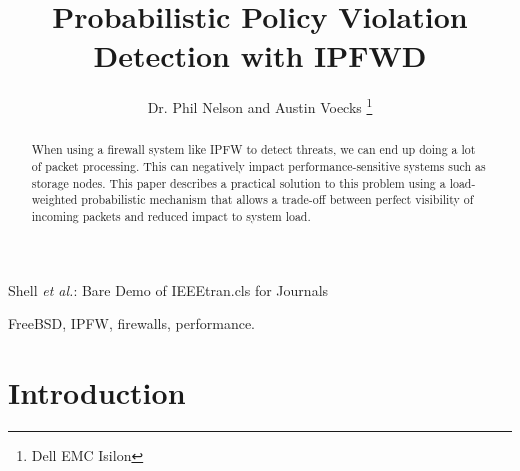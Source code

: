 \documentclass[journal]{IEEEtran}
\begin{document}
%
\title{Probabilistic Policy Violation Detection with IPFWD}

\author{Dr. Phil Nelson and Austin Voecks%
\thanks{Dell EMC Isilon}}


%
{Shell \MakeLowercase{\textit{et al.}}: Bare Demo of IEEEtran.cls for Journals}
% 


\maketitle


\begin{abstract}
When using a firewall system like IPFW to detect threats, we can end up doing a
lot of packet processing. This can negatively impact performance-sensitive
systems such as storage nodes. This paper describes a practical solution to
this problem using a load-weighted probabilistic mechanism that allows a
trade-off between perfect visibility of incoming packets and reduced impact to
system load.  

\end{abstract}


\begin{IEEEkeywords}
FreeBSD, IPFW, firewalls, performance.
\end{IEEEkeywords}


%
\IEEEpeerreviewmaketitle


\section{Introduction}
\end{document}
